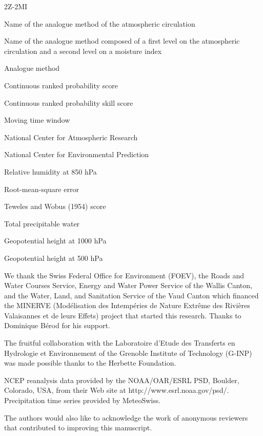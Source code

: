 \documentclass[hess, manuscript]{copernicus}
\begin{document}
	\begin{labeling}{2Z-2MI}
		\item [2Z] Name of the analogue method of the atmospheric circulation
		\item [2Z-2MI] Name of the analogue method composed of a first level on the atmospheric circulation and a second level on a moisture index
		\item [AM] Analogue method
		\item [CRPS] Continuous ranked probability score
		\item [CRPSS] Continuous ranked probability skill score
		\item [MTW] Moving time window
		\item [NCAR] National Center for Atmospheric Research
		\item [NCEP] National Center for Environmental Prediction
		\item [RH850] Relative humidity at 850 hPa
		\item [RMSE] Root-mean-square error
		\item [S1] Teweles and Wobus (1954) score
		\item [TPW] Total precipitable water
		\item [Z1000] Geopotential height at 1000 hPa
		\item [Z500] Geopotential height at 500 hPa
	\end{labeling}
	
	
	
	\begin{acknowledgements}
		We thank the Swiss Federal Office for Environment (FOEV), the Roads and Water Courses Service, Energy and Water Power Service of the Wallis Canton, and the Water, Land, and Sanitation Service of the Vaud Canton which financed the MINERVE (Mod\'{e}lisation des Intemp\'{e}ries de Nature Extr\^{e}me des Rivi\`{e}res Valaisannes et de leurs Effets) project that started this research. Thanks to Dominique B\'{e}rod for his support.
		
		The fruitful collaboration with the Laboratoire d'Etude des Transferts en Hydrologie et Environnement of the Grenoble Institute of Technology (G-INP) was made possible thanks to the Herbette Foundation. 
		
		NCEP reanalysis data provided by the NOAA/OAR/ESRL PSD, Boulder, Colorado, USA, from their Web site at http://www.esrl.noaa.gov/psd/. Precipitation time series provided by MeteoSwiss.
		
		The authors would also like to acknowledge the work of anonymous reviewers that contributed to improving this manuscript. 
	\end{acknowledgements}
	
\end{document}
